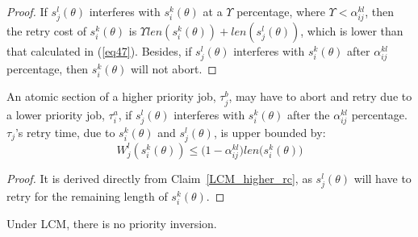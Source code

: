 \begin{proof}
If $s_{j}^{l}(\theta)$ interferes with $s_{i}^{k}(\theta)$
at a $\Upsilon$ percentage, where $\Upsilon<\alpha_{ij}^{kl}$,
then the retry cost of $s_{i}^{k}(\theta)$ is $\Upsilon len(s_{i}^{k}(\theta))+len(s_{j}^{l}(\theta))$, which is lower than that calculated in (\ref{eq47}). Besides, 
if $s_{j}^{l}(\theta)$ interferes with $s_{i}^{k}(\theta)$ after
$\alpha_{ij}^{kl}$ percentage, then $s_{i}^{k}(\theta)$ will not
abort.
\end{proof}


\begin{clm}
\label{LCM_lower_rc}
An atomic section of a higher priority job, $\tau_{j}^b$, may have to abort and retry due to a lower priority job, $\tau_{i}^a$, if $s_{j}^{l}(\theta)$ interferes
with $s_{i}^{k}(\theta)$ after the $\alpha_{ij}^{kl}$ percentage. $\tau_{j}$'s retry time, due to $s_{i}^{k}(\theta)$ and $s_{j}^{l}(\theta)$,
is upper bounded by:
 \begin{equation}
W_j^l(s_i^k(\theta))\le \Big(1-\alpha_{ij}^{kl}\Big)len\Big(s_{i}^{k}(\theta)\Big)\label{eq48}\end{equation}
\end{clm}

\begin{proof}
It is derived directly from Claim~\ref{LCM_higher_rc}, as $s_j^l(\theta)$ will have to retry for the remaining length of $s_i^k(\theta)$.
\end{proof}

\begin{clm}
\label{no priority inversion in lcm}
Under LCM, there is no priority inversion.
\end{clm}

